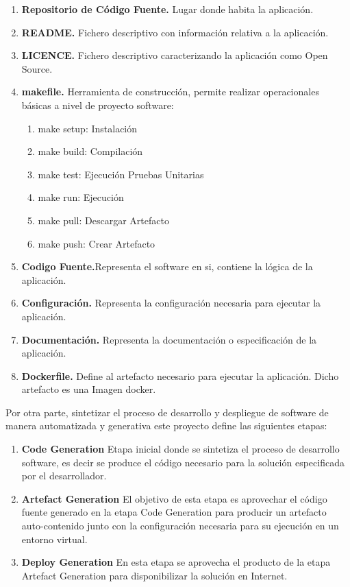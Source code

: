 \documentclass[a4paper,11pt]{book}
\begin{document}
\begin{enumerate}
\item \textbf{ Repositorio de Código Fuente. } Lugar donde habita la aplicación. 
\item \textbf{ README.} Fichero descriptivo con información relativa a  la aplicación. 
\item \textbf{ LICENCE. }Fichero descriptivo caracterizando la aplicación como Open Source. 
\item \textbf{ makefile.} Herramienta  de construcción, permite realizar operacionales básicas a nivel de proyecto software:

  \begin{enumerate}[label*=\arabic*.]
    \item make setup:  Instalación
    \item make build:  Compilación
    \item make test: Ejecución Pruebas Unitarias
   	\item make run: Ejecución
   	\item make pull: Descargar Artefacto
   	\item make push: Crear Artefacto	
  \end{enumerate}
  
  
\item \textbf{ Codigo Fuente.}Representa el software en si, contiene la lógica de la aplicación.  
\item \textbf{ Configuración.} Representa la configuración necesaria para ejecutar la aplicación. 
\item \textbf{ Documentación.} Representa la documentación o especificación de la aplicación. 
\item \textbf{ Dockerfile.} Define al artefacto necesario para ejecutar la aplicación. Dicho artefacto es una Imagen docker. 
\end{enumerate}




Por otra parte, sintetizar el proceso de desarrollo y despliegue de software de manera automatizada y generativa  este proyecto define las siguientes etapas: 

\begin{enumerate}
\item \textbf{ Code Generation }  Etapa inicial donde se sintetiza el proceso de desarrollo software, es decir se produce el código necesario para la solución especificada por el desarrollador.
\item \textbf{ Artefact Generation }  El objetivo de esta etapa es aprovechar el código fuente generado en la etapa Code Generation para producir un artefacto auto-contenido junto con la configuración necesaria para su ejecución en un entorno virtual.
\item \textbf{ Deploy Generation } En esta etapa se aprovecha el producto de la etapa Artefact Generation para disponibilizar la solución en Internet.
\end{enumerate}
\end{document}
